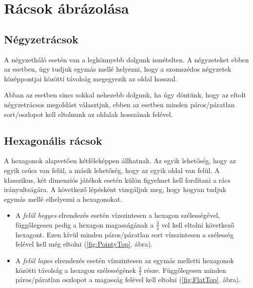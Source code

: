 \section{Rácsok ábrázolása}

\subsection{Négyzetrácsok}

A négyzetháló esetén van a legkönnyebb dolgunk ismételten. A négyzeteket ebben az esetben, úgy tudjuk egymás mellé helyezni, hogy a szomszédos négyzetek középpontjai közötti távolság megegyezik az oldal hosszal. 

Abban az esetben sincs sokkal nehezebb dolgunk, ha úgy döntünk, hogy az eltolt négyzetrácsos megoldást választjuk, ebben az esetben minden páros/páratlan sort/oszlopot kell eltolnunk az oldalak hosszának felével.

\subsection{Hexagonális rácsok}

A hexagonok alapvetően kétféleképpen állhatnak. Az egyik lehetőség, hogy az egyik csúcs van felül, a másik lehetőség, hogy az egyik oldal van felül. A klasszikus, két dimenziós játékok esetén külön figyelmet kell fordítani a rács irányultságára. A következő lépésként vizsgáljuk meg, hogy hogyan tudjuk egymás mellé elhelyezni a hexagonokat.
\begin{itemize}
    \item A \textit{felül hegyes} elrendezés esetén vízszintesen a hexagon szélességével, függőlegesen pedig a hexagon magasságának a $\frac{3}{4}$ vel kell eltolni következő hexagont. Ezen kívül minden páros/páratlan sort vízszintesen a szélesség felével kell még eltolni (\ref{fig:PointyTop}. ábra).
    \item A \textit{felül lapos} elrendezés esetén vízszintesen az egymás melletti hexagonok közötti távolság a hexagon szélességének $\frac{3}{4}$ része. Függőlegesen minden páros/páratlan oszlopot a magasság felével kell eltolni (\ref{fig:FlatTop}. ábra).
\end{itemize}

